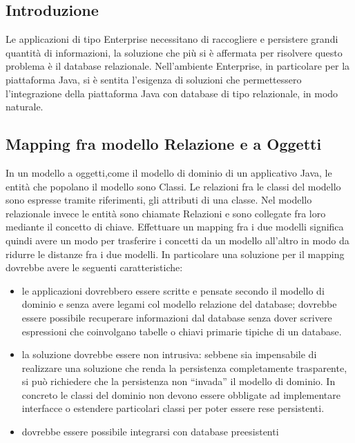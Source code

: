 \subsection{Introduzione}
Le applicazioni di tipo Enterprise necessitano di raccogliere e persistere grandi quantità di informazioni, la soluzione che più si è affermata per risolvere questo problema è il database relazionale. Nell'ambiente Enterprise, in particolare per la piattaforma Java, si è sentita l'esigenza di soluzioni che permettessero l'integrazione della piattaforma Java con database di tipo relazionale, in modo naturale. 

\subsection{Mapping fra modello Relazione e a Oggetti}
In un modello a oggetti,come il modello di dominio di un applicativo Java, le entità che popolano il modello sono Classi. Le relazioni fra le classi del modello sono espresse tramite riferimenti, gli attributi di una classe.
Nel modello relazionale invece le entità sono chiamate Relazioni e sono collegate fra loro mediante il concetto di chiave. Effettuare un mapping fra i due modelli significa quindi avere un modo per trasferire i concetti da un modello
all'altro in modo da ridurre le distanze fra i due modelli. In particolare una soluzione per il mapping dovrebbe avere le seguenti caratteristiche:

\begin{itemize}
 \item le applicazioni dovrebbero essere scritte e pensate secondo il modello di dominio e senza avere legami col modello relazione del database; dovrebbe essere possibile recuperare informazioni dal database senza dover scrivere espressioni
 che coinvolgano tabelle o chiavi primarie tipiche di un database.
 \item la soluzione dovrebbe essere non intrusiva: sebbene sia impensabile di realizzare una soluzione che renda la persistenza completamente trasparente, si può richiedere che la persistenza non ``invada'' il modello di dominio.
  In concreto le classi del dominio non devono essere obbligate ad implementare interfacce o estendere particolari classi per poter essere rese persistenti.
  \item dovrebbe essere possibile integrarsi con database preesistenti
\end{itemize}


